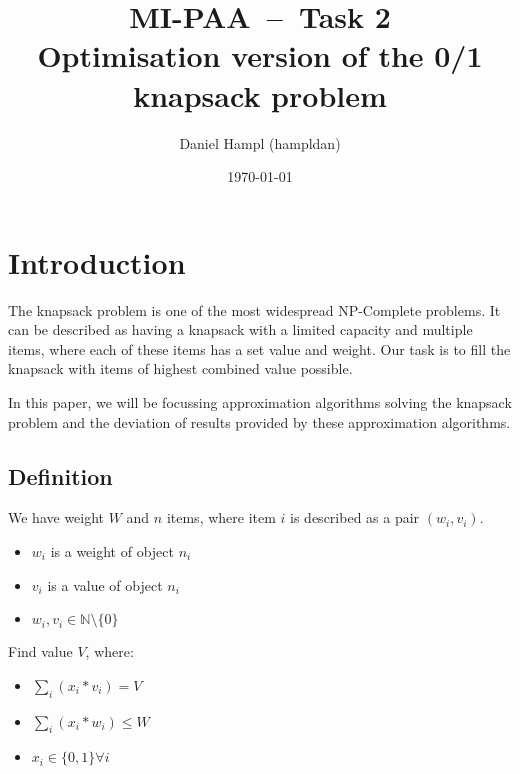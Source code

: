 
\RequirePackage{todonotes}
\RequirePackage[parfill]{parskip}
\RequirePackage[margin=2.8cm]{geometry}
\RequirePackage{hyperref}
\RequirePackage[english]{babel}
\RequirePackage{pgfplots}
\RequirePackage{listings}
\RequirePackage{amsfonts}
\RequirePackage{subfiles}
\RequirePackage{mathtools}

\providecommand{\tightlist}{%
  \setlength{\itemsep}{0pt}\setlength{\parskip}{0pt}}


\title{\textbf{MI-PAA~--~Task 2}\\
    Optimisation version of the 0/1 knapsack problem}
\author{Daniel Hampl (hampldan)}
\date{\today}
\maketitle

\tableofcontents
\newpage

\section{Introduction}
The knapsack problem is one of the most widespread NP-Complete problems. It can be described as having a knapsack with a limited capacity and multiple items, where each of these items has a set value and weight. Our task is to fill the knapsack with items of highest combined value possible.

In this paper, we will be focussing approximation algorithms solving the knapsack problem and the deviation of results provided by these approximation algorithms.

\subsection{Definition\cite{WEBSITE:knapsackDef}}
We have weight $W$ and $n$ items, where item $i$ is described as a pair $(w_i, v_i)$.

\begin{itemize}
    \item $w_i$ is a weight of object $n_i$
    \item $v_i$ is a value of object $n_i$
    \item $w_i, v_i \in \mathbb{N}\setminus\{0\}$
\end{itemize}

Find value $V$, where:

\begin{itemize}
    \item $\sum_i(x_i*v_i) = V$
    \item $\sum_i(x_i*w_i) \leq W$
    \item $x_i \in \{0,1\} \forall i$
\end{itemize}

